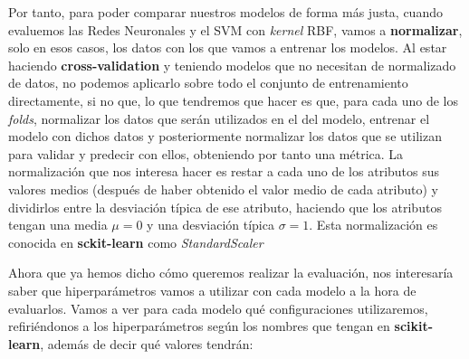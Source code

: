 \documentclass[11pt,a4paper]{article}
\begin{document}
Por tanto, para poder comparar nuestros modelos de forma más justa, cuando evaluemos las Redes Neuronales y el SVM con \textit{kernel} RBF, vamos
a \textbf{normalizar}, solo en esos casos, los datos con los que vamos a entrenar los modelos. Al estar haciendo \textbf{cross-validation} y teniendo
modelos que no necesitan de normalizado de datos, no podemos aplicarlo sobre todo el conjunto de entrenamiento directamente, si no que, lo que
tendremos que hacer es que, para cada uno de los \textit{folds}, normalizar los datos que serán utilizados en el del modelo, entrenar el modelo
con dichos datos y posteriormente normalizar los datos que se utilizan para validar y predecir con ellos, obteniendo por tanto una métrica.
La normalización que nos interesa hacer es restar a cada uno de los atributos sus valores medios (después de haber obtenido el valor medio de
cada atributo) y dividirlos entre la desviación típica de ese atributo, haciendo que los atributos tengan una media $\mu = 0$ y una desviación
típica $\sigma = 1$. Esta normalización es conocida en \textbf{sckit-learn} como \textit{StandardScaler}\cite{scaler}

Ahora que ya hemos dicho cómo queremos realizar la evaluación, nos interesaría saber que hiperparámetros vamos a utilizar con cada modelo a la
hora de evaluarlos. Vamos a ver para cada modelo qué configuraciones utilizaremos, refiriéndonos a los hiperparámetros según los nombres que
tengan en \textbf{scikit-learn}, además de decir qué valores tendrán:
\end{document}
